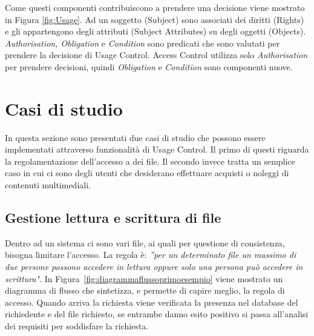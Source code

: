  Come questi componenti contribuiscono a prendere una decisione viene mostrato in Figura \ref{fig:Usage}. Ad un soggetto (Subject) sono associati dei diritti (Rights) e gli appartengono degli attributi (Subject Attributes) su degli oggetti (Objects). \textit{Authorisation, Obligation} e \textit{Condition} sono predicati che sono valutati per prendere la decisione di Usage Control. Access Control utilizza solo \textit{Authorisation} per prendere decisioni, quindi \textit{Obligation} e \textit{Condition} sono componenti nuove.

\section{Casi di studio}
\label{sec:casi_studio}
In questa sezione sono presentati due casi di studio che possono essere implementati attraverso funzionalità di Usage Control. Il primo di questi riguarda la 
regolamentazione dell'accesso a dei file. Il secondo invece tratta un semplice caso in cui ci sono 
degli utenti che desiderano effettuare acquisti o noleggi di contenuti multimediali.


\subsection{Gestione lettura e scrittura di file} %
\label{sub:case1}

Dentro ad un sistema ci sono vari file, ai quali per questione di consistenza, bisogna limitare l'accesso.
La regola è: \textit{”per un determinato file un massimo di due persone possono accedere in lettura oppure solo una persona può accedere in scrittura"}. In Figura~\ref{fig:diagrammaflussoprimoesempio} viene mostrato un diagramma di flusso che sintetizza, e permette di capire meglio, la regola di accesso. Quando arriva la richiesta viene verificata la presenza nel database del richiedente e del file richiesto, se entrambe danno esito positivo si passa all'analisi dei requisiti per soddisfare la richiesta. \par


